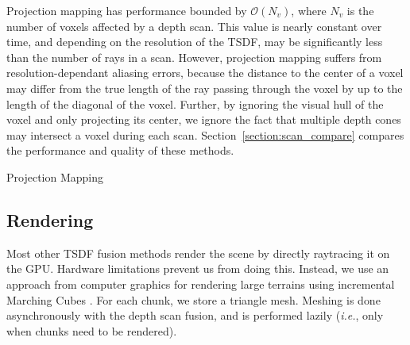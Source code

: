\documentclass[conference]{IEEEtran}
\newcommand{\sref}[1]{Section~\ref{#1}}
\newcommand{\ie}{\textit{i.e.}\xspace}
\newcommand{\TSDF}{TSDF\xspace}
\begin{document}
Projection mapping has performance bounded by $\mathcal{O}(N_v)$, where $N_v$ is
the number of voxels affected by a depth scan. This value is nearly constant
over time, and depending on the resolution of the \TSDF, may be significantly
less than the number of rays in a scan. However, projection mapping suffers from
resolution-dependant aliasing errors, because the distance to the center of a
voxel may differ from the true length of the ray passing through the voxel by up
to the length of the diagonal of the voxel. Further, by ignoring the visual
hull of the voxel and only projecting its center, we ignore the fact that
multiple depth cones may intersect a voxel during each scan.
\sref{section:scan_compare} compares the performance and quality of these methods.

\begin{algorithm} 
	\caption{Projection Mapping}
	\label{alg:projection_mapping}
	\begin{algorithmic}[1]
		 
		  
	     
		    	\label{alg:line:voxel_carve}
			\EndIf
	    \EndIf
		  
			\label{alg:line:tsdf_update}
		\EndIf
	\EndFor
	\end{algorithmic}
\end{algorithm}
\subsection{Rendering}
\label{section:render}
Most other \TSDF fusion methods \cite{Newcombe, NiessnerHashing} render the
scene by directly raytracing it on the GPU. Hardware limitations prevent us from doing
this. Instead, we use an approach from computer graphics for rendering large
terrains \cite{GPUGEMS3} using incremental Marching Cubes \cite{Lorensen1987}.
For each chunk, we store a triangle mesh. Meshing is done asynchronously with
the depth scan fusion, and is performed lazily (\ie, only when chunks need to
be rendered).
\end{document}
